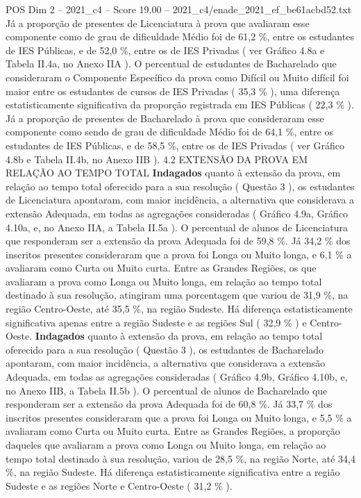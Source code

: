 \begin{textsample}{POS Dim 2 – 2021\_c4 – Score 19.00 – 2021\_c4/enade\_2021\_ef\_be61acbd52.txt}
Já a proporção de presentes de Licenciatura à prova que avaliaram esse componente como de grau de dificuldade Médio foi de 61,2 \%, entre os estudantes de IES Públicas, e de 52,0 \%, entre os de IES Privadas ( ver Gráfico 4.8a e Tabela II.4a, no Anexo IIA ).
O percentual de estudantes de Bacharelado que consideraram o Componente Específico da prova como Difícil ou Muito difícil foi maior entre os estudantes de cursos de IES Privadas ( 35,3 \% ), uma diferença estatisticamente significativa da proporção registrada em IES Públicas ( 22,3 \% ).
Já a proporção de presentes de Bacharelado à prova que consideraram esse componente como sendo de grau de dificuldade Médio foi de 64,1 \%, entre os estudantes de IES Públicas, e de 58,5 \%, entre os de IES Privadas ( ver Gráfico 4.8b e Tabela II.4b, no Anexo IIB ). 4.2 EXTENSÃO DA PROVA EM RELAÇÃO AO TEMPO TOTAL \textbf{Indagados} quanto à extensão da prova, em relação ao tempo total oferecido para a sua resolução ( Questão 3 ), os estudantes de Licenciatura apontaram, com maior incidência, a alternativa que considerava a extensão Adequada, em todas as agregações consideradas ( Gráfico 4.9a, Gráfico 4.10a, e, no Anexo IIA, a Tabela II.5a ).
O percentual de alunos de Licenciatura que responderam ser a extensão da prova Adequada foi de 59,8 \%.
Já 34,2 \% dos inscritos presentes consideraram que a prova foi Longa ou Muito longa, e 6,1 \% a avaliaram como Curta ou Muito curta.
Entre as Grandes Regiões, os que avaliaram a prova como Longa ou Muito longa, em relação ao tempo total destinado à sua resolução, atingiram uma porcentagem que variou de 31,9 \%, na região Centro-Oeste, até 35,5 \%, na região Sudeste.
Há diferença estatisticamente significativa apenas entre a região Sudeste e as regiões Sul ( 32,9 \% ) e Centro-Oeste. \textbf{Indagados} quanto à extensão da prova, em relação ao tempo total oferecido para a sua resolução ( Questão 3 ), os estudantes de Bacharelado apontaram, com maior incidência, a alternativa que considerava a extensão Adequada, em todas as agregações consideradas ( Gráfico 4.9b, Gráfico 4.10b, e, no Anexo IIB, a Tabela II.5b ).
O percentual de alunos de Bacharelado que responderam ser a extensão da prova Adequada foi de 60,8 \%.
Já 33,7 \% dos inscritos presentes consideraram que a prova foi Longa ou Muito longa, e 5,5 \% a avaliaram como Curta ou Muito curta.
Entre as Grandes Regiões, a proporção daqueles que avaliaram a prova como Longa ou Muito longa, em relação ao tempo total destinado à sua resolução, variou de 28,5 \%, na região Norte, até 34,4 \%, na região Sudeste.
Há diferença estatisticamente significativa entre a região Sudeste e as regiões Norte e Centro-Oeste ( 31,2 \% ).

\end{textsample}
